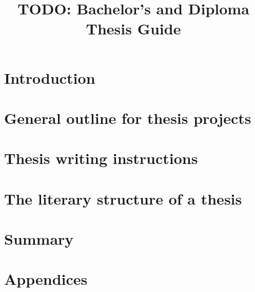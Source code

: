 \documentclass[english, online, cse, master]{dithesis}
\title{TODO: Bachelor's and Diploma Thesis Guide}
\begin{document}
\pagestyle{empty}
\maketitlepage
\makecopyrightpage

\makeabstracts

\contents %


    
\mainmatter

\chapter{Introduction} %
  \label{introduction} %
    
\chapter{General outline for thesis projects}
  \label{relatedwork}
  
    
\chapter{Thesis writing instructions}
  \label{implementation}
  
    
\chapter{The literary structure of a thesis}
  \label{experiments}
  
    
\chapter{Summary}
  \label{summary}
  
    
\printbibliography[heading=bibnumbered, title=\mybibname]

\startappendix
\chapter{Appendices}
  
\end{document}
